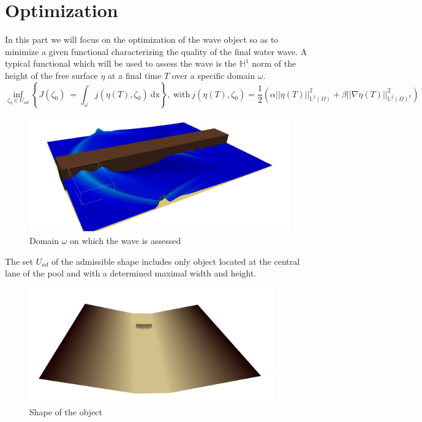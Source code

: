 \documentclass[11pt,a4paper]{article}
\begin{document}
\section{Optimization}
	In this part we will focus on the optimization of the wave object so as to minimize a given functional characterizing the quality of the final water wave.
	A typical functional which will be used to assess the wave is the $\mathbb{H}^1$ norm of the height of the free surface  $\eta$ at a final time $T$ over a specific domain $\omega$.
		\begin{equation}
			\inf_{\zeta_0 \in U_{ad}}\left\{J(\zeta_0)\ = \int_{\omega}{\! j(\eta(T),\zeta_0) \: \mathrm{dx}} \right\}, \: \mathrm{with} \: j(\eta(T),\zeta_0) = \frac{1}{2}(\alpha ||\eta(T)||_{\mathbb{L}^2(\Omega)}^2 + \beta ||\nabla \eta(T)||_{\mathbb{L}^2(\Omega)^2}^2)
		\end{equation}
		\begin{figure}[!h]
			\centering
			\includegraphics[height=5cm]{OptimizationDomain}
			\caption{Domain $\omega$ on which the wave is assessed}
		\end{figure}
		
		The set $U_{ad}$ of the admissible shape includes only object located at the central lane of the pool and with a determined maximal width and height.
		
		\begin{figure}[!h]
			\centering
			\includegraphics[height=5cm]{Object}
			\caption{Shape of the object}
		\end{figure}
				
\end{document}

